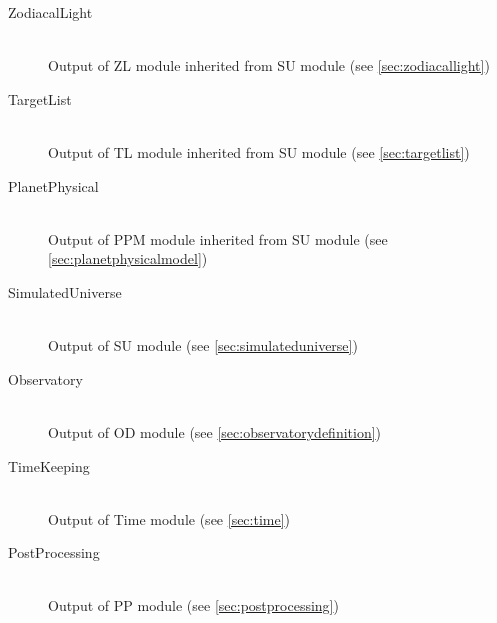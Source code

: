 \documentclass[cleanfoot]{asme2ej}
\begin{document}
\begin{itemize}
\begin{description}
        \item[ZodiacalLight] \hfill \\
        Output of ZL module inherited from SU module (see \ref{sec:zodiacallight})
        \item[TargetList] \hfill \\
        Output of TL module inherited from SU module (see \ref{sec:targetlist})
        \item[PlanetPhysical] \hfill \\
        Output of PPM module inherited from SU module (see \ref{sec:planetphysicalmodel})
        \item[SimulatedUniverse] \hfill \\
        Output of SU module (see \ref{sec:simulateduniverse})
        \item[Observatory] \hfill \\
        Output of OD module (see \ref{sec:observatorydefinition})
        \item[TimeKeeping] \hfill \\
        Output of Time module (see \ref{sec:time})
        \item[PostProcessing] \hfill \\
        Output of PP module (see \ref{sec:postprocessing})
    \end{description}
\end{itemize}
\end{document}
